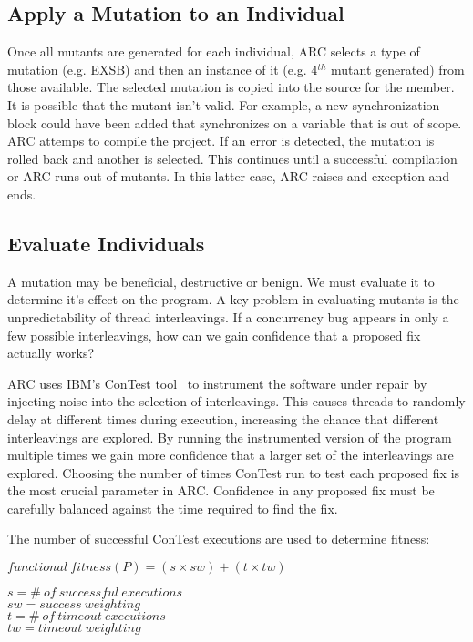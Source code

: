 \documentclass[runningheads,a4paper]{llncs}
\begin{document}
\subsection{Apply a Mutation to an Individual}
\label{sec:mutate_individuals}

Once all mutants are generated for each individual, ARC selects a type of mutation (e.g. EXSB) and then an instance of it (e.g. 4$^{th}$ mutant generated) from those available. The selected mutation is copied into the source for the member. It is possible that the mutant isn't valid. For example, a new synchronization block could have been added that synchronizes on a variable that is out of scope. ARC attemps to compile the project.  If an error is detected, the mutation is rolled back and another is selected. This continues until a successful compilation or ARC runs out of mutants. In this latter case, ARC raises and exception and ends.

\subsection{Evaluate Individuals}
\label{sec:evalute_individuals}

A mutation may be beneficial, destructive or benign. We must evaluate it to determine it's effect on the program. A key problem in evaluating mutants is the unpredictability of thread interleavings. If a concurrency bug appears in only a few possible interleavings, how can we gain confidence that a proposed fix actually works? 

ARC uses IBM's ConTest tool~\cite{EFN+02} to instrument the software under repair by injecting noise into the selection of interleavings. This causes threads to randomly delay at different times during execution, increasing the chance that different interleavings are explored. By running the instrumented version of the program multiple times we gain more confidence that a larger set of the interleavings are explored. Choosing the number of times ConTest run to test each proposed fix is the most crucial parameter in ARC.  Confidence in any proposed fix must be carefully balanced against the time required to find the fix.

The number of successful ConTest executions are used to determine fitness:
\newline
\begin{footnotesize}
\begin{center}
$functional\ fitness(P) = (s \times sw) + (t \times tw)$
\end{center}
\end{footnotesize}
\begin{scriptsize}
\begin{center}
$s = \#\ of\ successful\ executions$ \\
$sw = success\ weighting$ \\
$t = \#\ of\ timeout\ executions$ \\
$tw = timeout\ weighting$
\end{center}
\end{scriptsize}
\end{document}
